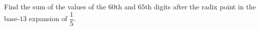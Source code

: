 Find the sum of the values of the $60$th and $65$th digits after the radix point in the base-$13$ expansion of $\dfrac{1}{5}$.
